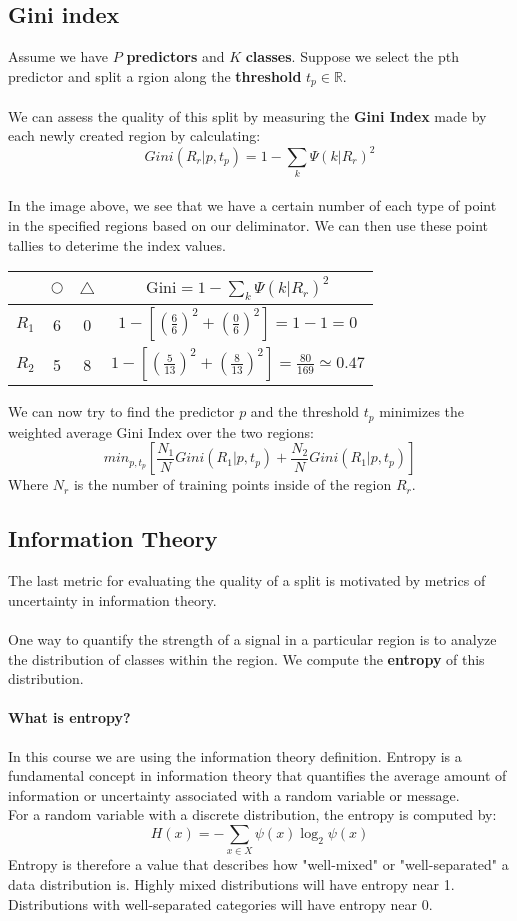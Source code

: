 \documentclass[10pt,a4paper]{report}
\begin{document}
\subsection{Gini index}
Assume we have $P$ \textbf{predictors} and $K$ \textbf{classes}. Suppose we select the pth predictor and split a rgion along the \textbf{threshold} $t_p\in\mathbb{R}$.\\\\We can assess the quality of this split by measuring the \textbf{Gini Index} made by each newly created region by calculating:
$$Gini(R_r|p,t_p) = 1 - \sum_{k}\Psi(k|R_r)^2 $$
\\
In the image above, we see that we have a certain number of each type of point in the specified regions based on our deliminator. We can then use these point tallies to deterime the index values.\\
\begin{center}
\begin{tabular}{ |c|c|c|c| } 
 \hline
  & $\bigcirc$ & $\triangle$ & $\textrm{Gini}= 1-\sum_k\Psi(k|R_r)^2$\\\hline\hline
 $R_1$ & 6 & 0 & $1 - \left[\left(\frac{6}{6}\right)^2 + \left(\frac{0}{6}\right)^2 \right] = 1-1=0$\\\hline
 $R_2$ & 5 & 8 & $1 - \left[\left(\frac{5}{13}\right)^2 + \left(\frac{8}{13}\right)^2 \right] = \frac{80}{169} \simeq 0.47$\\\hline
\end{tabular}
\end{center}
We can now try to find the predictor $p$ and the threshold $t_p$ minimizes the weighted average Gini Index over the two regions:$$min_{p,t_p}\left[\frac{N_1}{N}Gini(R_1|p,t_p)+\frac{N_2}{N}Gini(R_1|p,t_p)\right]$$Where $N_r$ is the number of training points inside of the region $R_r$.
\subsection{Information Theory}
The last metric for evaluating the quality of a split is motivated by metrics of uncertainty in information theory.\\\\One way to quantify the strength of a signal in a particular region is to analyze the distribution of classes within the region. We compute the \textbf{entropy} of this distribution.
\paragraph{What is entropy?}In this course we are using the information theory definition. Entropy is a fundamental concept in information theory that quantifies the average amount of information or uncertainty associated with a random variable or message.\\For a random variable with a discrete distribution, the entropy is computed by:
$$H(x) = - \sum_{x\in X}\psi(x)\log_2\psi(x)$$
Entropy is therefore a value that describes how "well-mixed" or "well-separated" a data distribution is. Highly mixed distributions will have entropy near 1. Distributions with well-separated categories will have entropy near 0.
\end{document}
